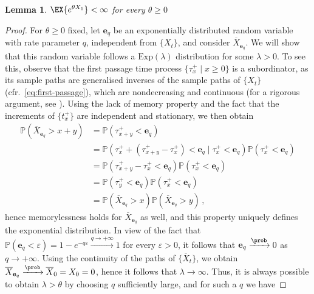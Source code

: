 \documentclass[titlepage]{article}
\theoremstyle{plain}
\newtheorem{lemma}{Lemma}[section]
\theoremstyle{definition}
\DeclareRobustCommand{\cprobX}[3][{\mathbb{P}}]{\ensuremath{ {#1}\left( {#2} \mid {#3}\right)}}
\DeclareRobustCommand{\probX}[2][{\mathbb{P}}]{\ensuremath{ {#1}\left( {#2} \right)}}
\begin{document}
\begin{lemma}
  $\EX{e^{\theta X_1}} < \infty$ for every $\theta \geq 0$
\end{lemma}

\begin{proof}
  For $\theta \geq 0$ fixed, let $\mathbf{e}_q$ be an exponentially distributed random variable with rate parameter $q$, independent from $\{ X_t \}$, and consider $\overline{X}_{\mathbf{e}_q}$. We will show that this random variable follows a $\mathrm{Exp}(\lambda)$ distribution for some $\lambda > 0$. To see this, observe that the first passage time process $\{ \tau^+_x \mid x \geq 0 \}$ is a subordinator, as its sample paths are generalised inverses of the sample paths of $\{ X_t \}$ (cfr.\ \cref{eq:first-passage}), which are nondecreasing and continuous (for a rigorous argument, see \cite[Chapter VII, Theorem 1]{bertoin}). Using the lack of memory property and the fact that the increments of $\{ t_x^+ \}$ are independent and stationary, we then obtain
  \begin{align}
    \probX{\overline{X}_{\mathbf{e}_q} > x + y} & = \probX{\tau_{x + y}^+ < \mathbf{e}_q}                                                                                   \\
                                                & = \cprobX{\tau_x^+ + (\tau_{x + y}^+ - \tau_x^+) < \mathbf{e}_q}{\tau_x^+ < \mathbf{e}_q} \probX{\tau_x^+ < \mathbf{e}_q} \\
                                                & = \probX{\tau_{x + y}^+ - \tau_x^+ < \mathbf{e}_q} \probX{\tau_x^+ < \mathbf{e}_q}                                        \\
                                                & = \probX{\tau_y^+ < \mathbf{e}_q} \probX{\tau_x^+ < \mathbf{e}_q}                                                         \\
                                                & =  \probX{\overline{X}_{\mathbf{e}_q} > x } \probX{\overline{X}_{\mathbf{e}_q} > y} \,,
  \end{align}
  hence memorylessness holds for $\overline{X}_{\mathbf{e}_q}$ as well, and this property uniquely defines the exponential distribution. In view of the fact that $\probX{\mathbf{e}_q < \varepsilon} = 1 - e^{-q \varepsilon} \xrightarrow{q \to +\infty} 1$ for every $\varepsilon > 0$, it follows that $\mathbf{e}_q \xrightarrow{\prob} 0$ as $q \to +\infty$. Using the continuity of the paths of $\{ \overline{X}_t \}$, we obtain $\overline{X}_{\mathbf{e}_q} \xrightarrow{\prob} \overline{X}_0 = X_0 = 0$, hence it follows that $\lambda \to \infty$. Thus, it is always possible to obtain $\lambda > \theta$ by choosing $q$ sufficiently large, and for such a $q$ we have

\end{proof}
\end{document}
